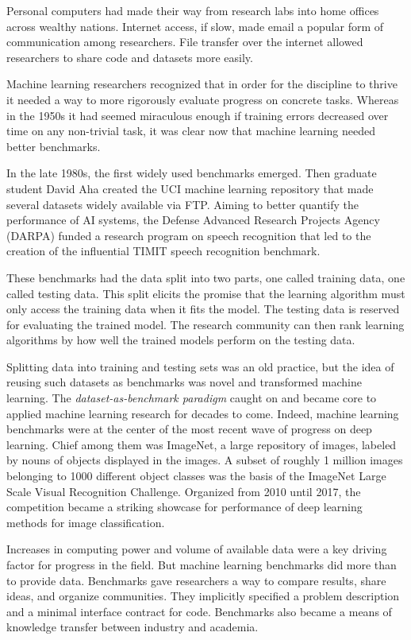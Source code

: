 \documentclass{tufte-book}
\begin{document}
Personal computers had made their way from research labs into home
offices across wealthy nations. Internet access, if slow, made email a
popular form of communication among researchers. File transfer over the
internet allowed researchers to share code and datasets more easily.

Machine learning researchers recognized that in order for the discipline
to thrive it needed a way to more rigorously evaluate progress on
concrete tasks. Whereas in the 1950s it had seemed miraculous enough if
training errors decreased over time on any non-trivial task, it was
clear now that machine learning needed better benchmarks.

In the late 1980s, the first widely used benchmarks emerged. Then
graduate student David Aha created the UCI machine learning repository
that made several datasets widely available via FTP. Aiming to better
quantify the performance of AI systems, the Defense Advanced Research
Projects Agency (DARPA) funded a research program on speech recognition
that led to the creation of the influential TIMIT speech recognition
benchmark.

These benchmarks had the data split into two parts, one called training
data, one called testing data. This split elicits the promise that the
learning algorithm must only access the training data when it fits the
model. The testing data is reserved for evaluating the trained model.
The research community can then rank learning algorithms by how well the
trained models perform on the testing data.

Splitting data into training and testing sets was an old practice, but
the idea of reusing such datasets as benchmarks was novel and
transformed machine learning. The \emph{dataset-as-benchmark paradigm}
caught on and became core to applied machine learning research for
decades to come. Indeed, machine learning benchmarks were at the center
of the most recent wave of progress on deep learning. Chief among them
was ImageNet, a large repository of images, labeled by nouns of objects
displayed in the images. A subset of roughly 1 million images belonging
to 1000 different object classes was the basis of the ImageNet Large
Scale Visual Recognition Challenge. Organized from 2010 until 2017, the
competition became a striking showcase for performance of deep learning
methods for image classification.

Increases in computing power and volume of available data were a key
driving factor for progress in the field. But machine learning
benchmarks did more than to provide data. Benchmarks gave researchers a
way to compare results, share ideas, and organize communities. They
implicitly specified a problem description and a minimal interface
contract for code. Benchmarks also became a means of knowledge transfer
between industry and academia.
\end{document}

